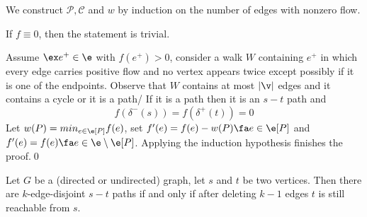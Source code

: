 \begin{prf}
    We construct $\mathcal{P}, \mathcal{C}$ and $w$ by induction on the number of edges with nonzero flow.

    If $f \equiv 0$, then the statement is trivial.

    Assume $\ex e^+ \in \e$ with $f(e^+) > 0$, consider a walk $W$ containing $e^+$ in which every edge carries positive flow and no vertex appears twice except possibly if it is one of the endpoints. Observe that $W$ contains at most $|\v|$ edges and it contains a cycle or it is a path/ If it is a path then it is an $s - t$ path and
    \begin{equation*}
        f(\delta^-(s)) = f(\delta^+(t)) = 0
    \end{equation*}
    Let $w(P) = min_{e \in \e[P]}f(e)$, set $f'(e ) = f(e) - w(P) \fa e \in \e[P]$ and $f'(e) = f(e) \fa e \in \e \setminus \e[P]$. Applying the induction hypothesis finishes the proof.\qed
\end{prf}
\begin{customcorollary}{3.18}
\label{corollary:3.18}
    Let $G$ be a (directed or undirected) graph, let $s$ and $t$ be two vertices. Then there are $k$-edge-disjoint $s - t$ paths if and only if after deleting $k - 1$ edges $t$ is still reachable from $s$.
\end{customcorollary}